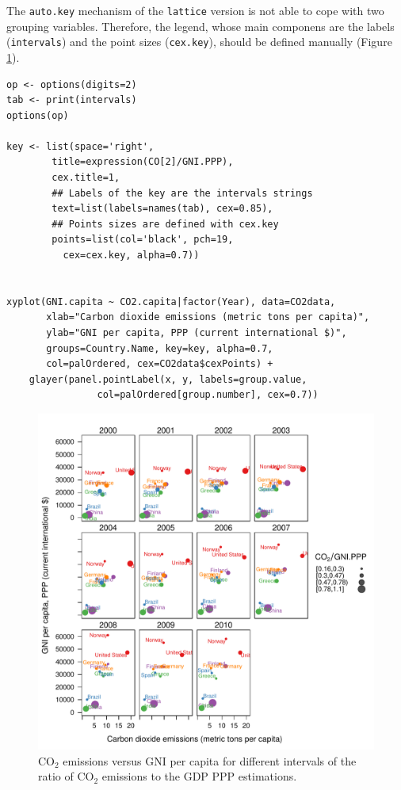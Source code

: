 The \texttt{auto.key} mechanism of the \texttt{lattice} version is not able to cope
with two grouping variables. Therefore, the legend, whose main
componens are the labels (\texttt{intervals}) and the point sizes
(\texttt{cex.key}), should be defined manually (Figure \ref{fig:CO2points}).


\lstset{language=R,numbers=none}
\begin{lstlisting}
op <- options(digits=2)
tab <- print(intervals)
options(op)

key <- list(space='right',
	    title=expression(CO[2]/GNI.PPP),
	    cex.title=1,
	    ## Labels of the key are the intervals strings
	    text=list(labels=names(tab), cex=0.85),
	    ## Points sizes are defined with cex.key
	    points=list(col='black', pch=19,
	      cex=cex.key, alpha=0.7))


xyplot(GNI.capita ~ CO2.capita|factor(Year), data=CO2data,
       xlab="Carbon dioxide emissions (metric tons per capita)",
       ylab="GNI per capita, PPP (current international $)",
       groups=Country.Name, key=key, alpha=0.7,
       col=palOrdered, cex=CO2data$cexPoints) +
    glayer(panel.pointLabel(x, y, labels=group.value,
			    col=palOrdered[group.number], cex=0.7))
\end{lstlisting}

\begin{figure}[htb]
\centering
\includegraphics[width=.9\linewidth]{figs/CO2points.pdf}
\caption{\label{fig:CO2points}$\mathrm{CO_2}$ emissions versus GNI per capita for different intervals of the ratio of $\mathrm{CO_2}$ emissions to the GDP PPP estimations.}
\end{figure}
